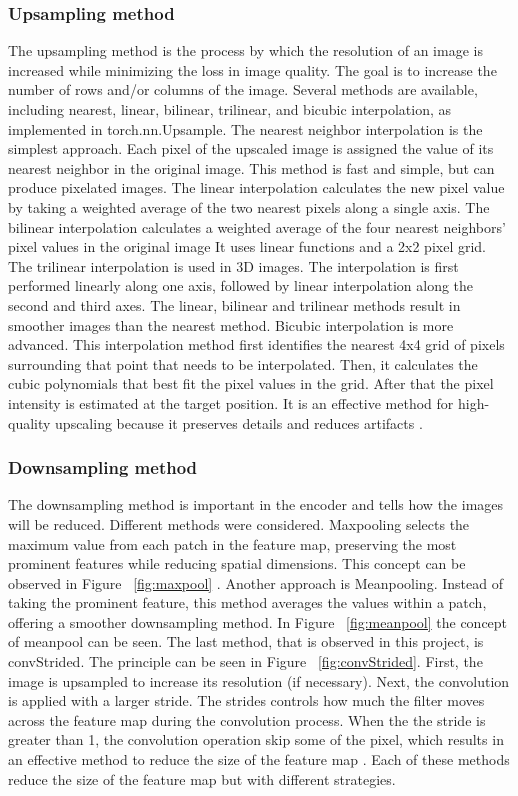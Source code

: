 \documentclass[twocolumn]{article}
\begin{document}
\subsubsection{Upsampling method}
The upsampling method is the process by which the resolution of an image is increased while minimizing the loss in image quality. The goal is to increase the number of rows and/or columns of the image. Several methods are available, including nearest, linear, bilinear, trilinear, and bicubic interpolation, as implemented in torch.nn.Upsample.
The nearest neighbor interpolation is the simplest approach. Each pixel of the upscaled image is assigned the value of its nearest neighbor in the original image. This method is fast and simple, but can produce pixelated images.
The linear interpolation calculates the new pixel value by taking a weighted average of the two nearest pixels along a single axis. The bilinear interpolation calculates a weighted average of the four nearest neighbors' pixel values in the original image It uses linear functions and a 2x2 pixel grid. The trilinear interpolation is used in 3D images. The interpolation is first performed linearly along one axis, followed by linear interpolation along the second and third axes. The linear, bilinear and trilinear methods result in smoother images than the nearest method.
Bicubic interpolation is more advanced. This interpolation method first identifies the nearest 4x4 grid of pixels surrounding that point that needs to be interpolated. Then, it calculates the cubic polynomials that best fit the pixel values in the grid. After that the pixel intensity is estimated at the target position. It is an effective method for high-quality upscaling because it preserves details and reduces artifacts \cite{amanrao-2023} \cite{unknown-author-2025}.

\subsubsection{Downsampling method}
The downsampling method is important in the encoder and tells how the images will be reduced. Different methods were considered. Maxpooling selects the maximum value from each patch in the feature map, preserving the most prominent features while reducing spatial dimensions. This concept can be observed in Figure ~\ref{fig:maxpool} \cite{dhanushkumar-2023}.
Another approach is Meanpooling. Instead of taking the prominent feature, this method averages the values within a patch, offering a smoother downsampling method. In Figure ~\ref{fig:meanpool} the concept of meanpool can be seen.
The last method, that is observed in this project, is convStrided. The principle can be seen in Figure ~\ref{fig:convStrided}. First, the image is upsampled to increase its resolution (if necessary). Next, the convolution is applied with a larger stride. The strides controls how much the filter moves across the feature map during the convolution process. When the the stride is greater than 1, the convolution operation skip some of the pixel, which results in an effective method to reduce the size of the feature map \cite{unknown-author-no-date2}.
Each of these methods reduce the size of the feature map but with different strategies.
\end{document}
